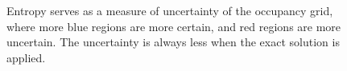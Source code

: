 \documentclass[letterpaper, 10pt, conference]{ieeeconf}
\begin{document}
\begin{figure}
\centerline{
}
\centerline{
}
\caption{Entropy serves as a measure of uncertainty of the occupancy grid, where more blue regions are more certain, and red regions are more uncertain. The uncertainty is always less when the exact solution is applied.}\label{fig:NumResOccH}
\end{figure}
\end{document}
